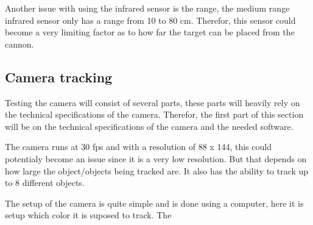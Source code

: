 Another issue with using the infrared sensor is the range, the medium range
infrared sensor only has a range from 10 to 80 cm. Therefor, this sensor could
become a very limiting factor as to how far the target can be placed from the
cannon. 

\subsection{Camera tracking}%
Testing the camera will consist of several parts, these parts will heavily rely
on the technical specifications of the camera. Therefor, the first part of this
section will be on the technical specifications of the camera and the needed
software.\nl

The camera runs at 30 fps and with a resolution of 88 x 144, this could
potentialy become an issue since it is a very low resolution. But that depends
on how large the object/objects being tracked are. It also has the ability to
track up to 8 different objects. \nl

The setup of the camera is quite simple and is done using a computer, here it is
setup which color it is suposed to track. The 
